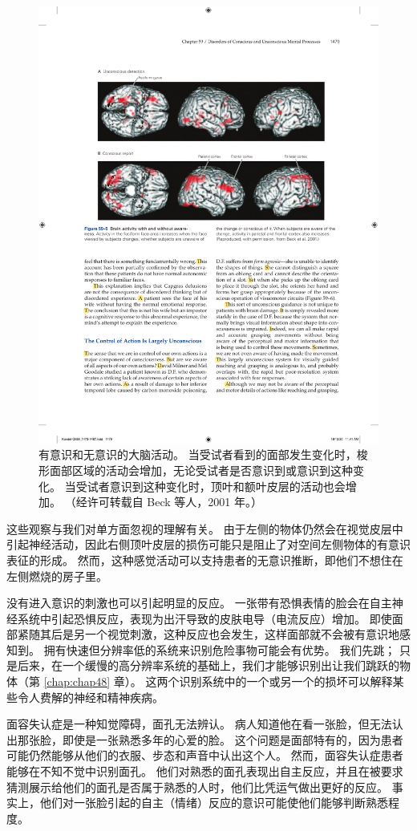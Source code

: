 \begin{figure}[htbp]
	\centering
	\includegraphics[width=0.8\linewidth]{chap59/fig_59_5}
	\caption{有意识和无意识的大脑活动。 当受试者看到的面部发生变化时，梭形面部区域的活动会增加，无论受试者是否意识到或意识到这种变化。 当受试者意识到这种变化时，顶叶和额叶皮层的活动也会增加。 （经许可转载自 Beck 等人，2001 年。）}
	\label{fig:59_5}
\end{figure}

这些观察与我们对单方面忽视的理解有关。 由于左侧的物体仍然会在视觉皮层中引起神经活动，因此右侧顶叶皮层的损伤可能只是阻止了对空间左侧物体的有意识表征的形成。 然而，这种感觉活动可以支持患者的无意识推断，即他们不想住在左侧燃烧的房子里。

没有进入意识的刺激也可以引起明显的反应。 一张带有恐惧表情的脸会在自主神经系统中引起恐惧反应，表现为出汗导致的皮肤电导（电流反应）增加。 即使面部紧随其后是另一个视觉刺激，这种反应也会发生，这样面部就不会被有意识地感知到。 拥有快速但分辨率低的系统来识别危险事物可能会有优势。 我们先跳； 只是后来，在一个缓慢的高分辨率系统的基础上，我们才能够识别出让我们跳跃的物体（第 \ref{chap:chap48} 章）。 这两个识别系统中的一个或另一个的损坏可以解释某些令人费解的神经和精神疾病。

面容失认症是一种知觉障碍，面孔无法辨认。 病人知道他在看一张脸，但无法认出那张脸，即使是一张熟悉多年的心爱的脸。 这个问题是面部特有的，因为患者可能仍然能够从他们的衣服、步态和声音中认出这个人。 然而，面容失认症患者能够在不知不觉中识别面孔。 他们对熟悉的面孔表现出自主反应，并且在被要求猜测展示给他们的面孔是否属于熟悉的人时，他们比凭运气做出更好的反应。 事实上，他们对一张脸引起的自主（情绪）反应的意识可能使他们能够判断熟悉程度。

